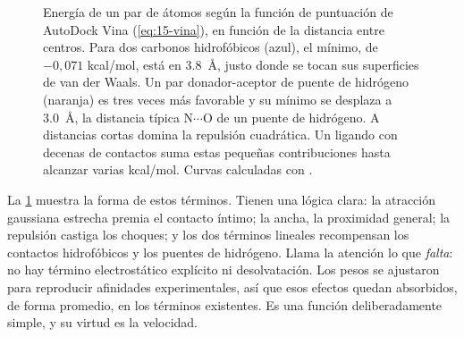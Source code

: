 \begin{figure}[t]
\centering
{}
\caption[Términos de la función de Vina]{Energía de un par de átomos según la función de puntuación de AutoDock Vina (\cref{eq:15-vina}), en función de la distancia entre centros. Para dos carbonos hidrofóbicos (azul), el mínimo, de $-0{,}071$ kcal/mol, está en \SI{3,8}{\angstrom}, justo donde se tocan sus superficies de van der Waals. Un par donador-aceptor de puente de hidrógeno (naranja) es tres veces más favorable y su mínimo se desplaza a \SI{3,0}{\angstrom}, la distancia típica N$\cdots$O de un puente de hidrógeno. A distancias cortas domina la repulsión cuadrática. Un ligando con decenas de contactos suma estas pequeñas contribuciones hasta alcanzar varias kcal/mol. Curvas calculadas con .}
\label{fig:15-vina}
\end{figure}

La \cref{fig:15-vina} muestra la forma de estos términos. Tienen una lógica clara: la atracción gaussiana estrecha premia el contacto íntimo; la ancha, la proximidad general; la repulsión castiga los choques; y los dos términos lineales recompensan los contactos hidrofóbicos y los puentes de hidrógeno. Llama la atención lo que \emph{falta}: no hay término electrostático explícito ni desolvatación. Los pesos se ajustaron para reproducir afinidades experimentales, así que esos efectos quedan absorbidos, de forma promedio, en los términos existentes. Es una función deliberadamente simple, y su virtud es la velocidad.

